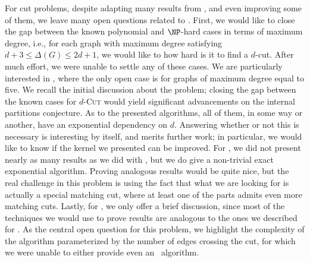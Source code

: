 For cut problems, despite adapting many results from , and even improving some of them, we leave many open questions related to .
First, we would like to close the gap between the known polynomial and $\NP$-hard cases in terms of maximum degree, i.e., for each graph with maximum degree satisfying $d+3 \leq \Delta(G) \leq 2d+1$, we would like to how hard is it to find a $d$-cut.
After much effort, we were unable to settle any of these cases.
We are particularly interested in , where the only open case is for graphs of maximum degree equal to five.
We recall the initial discussion about the  problem; closing the gap between the known cases for \textsc{$d$-Cut} would yield significant advancements on the internal partitions conjecture.
As to the presented algorithms, all of them, in some way or another, have an exponential dependency on $d$.
Answering whether or not this is necessary is interesting by itself, and merits further work; in particular, we would like to know if the kernel we presented can be improved.
For , we did not present nearly as many results as we did with , but we do give a non-trivial exact exponential algorithm.
Proving analogous results would be quite nice, but the real challenge in this problem is using the fact that what we are looking for is actually a special matching cut, where at least one of the parts admits even more matching cuts.
Lastly, for , we only offer a brief discussion, since most of the techniques we would use to prove results are analogous to the ones we described for .
As the central open question for this problem, we highlight the complexity of the algorithm parameterized by the number of edges crossing the cut, for which we were unable to either provide even an \XP\ algorithm.

